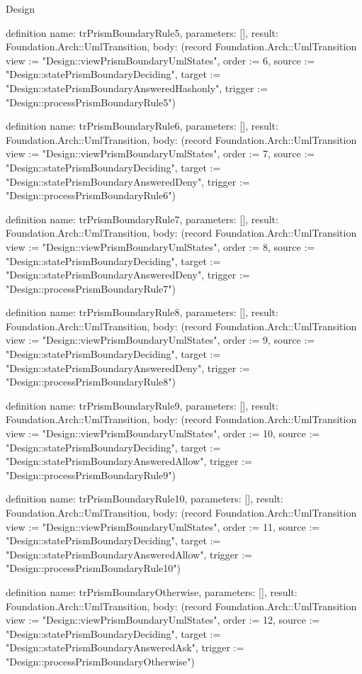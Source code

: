 \begin{lexlean}{Design}
\begin{semanticmodule}
definition{
  name: trPrismBoundaryRule5,
  parameters: [],
  result: Foundation.Arch::UmlTransition,
  body: (record Foundation.Arch::UmlTransition {view := "Design::viewPrismBoundaryUmlStates", order := 6, source := "Design::statePrismBoundaryDeciding", target := "Design::statePrismBoundaryAnsweredHashonly", trigger := "Design::processPrismBoundaryRule5"})
}

definition{
  name: trPrismBoundaryRule6,
  parameters: [],
  result: Foundation.Arch::UmlTransition,
  body: (record Foundation.Arch::UmlTransition {view := "Design::viewPrismBoundaryUmlStates", order := 7, source := "Design::statePrismBoundaryDeciding", target := "Design::statePrismBoundaryAnsweredDeny", trigger := "Design::processPrismBoundaryRule6"})
}

definition{
  name: trPrismBoundaryRule7,
  parameters: [],
  result: Foundation.Arch::UmlTransition,
  body: (record Foundation.Arch::UmlTransition {view := "Design::viewPrismBoundaryUmlStates", order := 8, source := "Design::statePrismBoundaryDeciding", target := "Design::statePrismBoundaryAnsweredDeny", trigger := "Design::processPrismBoundaryRule7"})
}

definition{
  name: trPrismBoundaryRule8,
  parameters: [],
  result: Foundation.Arch::UmlTransition,
  body: (record Foundation.Arch::UmlTransition {view := "Design::viewPrismBoundaryUmlStates", order := 9, source := "Design::statePrismBoundaryDeciding", target := "Design::statePrismBoundaryAnsweredDeny", trigger := "Design::processPrismBoundaryRule8"})
}

definition{
  name: trPrismBoundaryRule9,
  parameters: [],
  result: Foundation.Arch::UmlTransition,
  body: (record Foundation.Arch::UmlTransition {view := "Design::viewPrismBoundaryUmlStates", order := 10, source := "Design::statePrismBoundaryDeciding", target := "Design::statePrismBoundaryAnsweredAllow", trigger := "Design::processPrismBoundaryRule9"})
}

definition{
  name: trPrismBoundaryRule10,
  parameters: [],
  result: Foundation.Arch::UmlTransition,
  body: (record Foundation.Arch::UmlTransition {view := "Design::viewPrismBoundaryUmlStates", order := 11, source := "Design::statePrismBoundaryDeciding", target := "Design::statePrismBoundaryAnsweredAllow", trigger := "Design::processPrismBoundaryRule10"})
}

definition{
  name: trPrismBoundaryOtherwise,
  parameters: [],
  result: Foundation.Arch::UmlTransition,
  body: (record Foundation.Arch::UmlTransition {view := "Design::viewPrismBoundaryUmlStates", order := 12, source := "Design::statePrismBoundaryDeciding", target := "Design::statePrismBoundaryAnsweredAsk", trigger := "Design::processPrismBoundaryOtherwise"})
}


\end{semanticmodule}
\end{lexlean}
